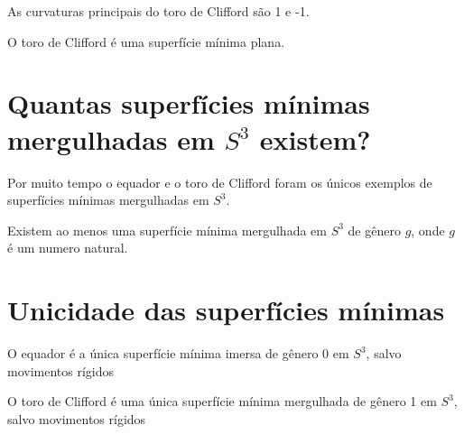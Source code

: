 \begin{proposicao}
	As curvaturas principais do toro de Clifford são 1 e -1.
\end{proposicao}

\begin{proposicao}
	O toro de Clifford é uma superfície mínima plana.
\end{proposicao}

\section{Quantas superfícies mínimas mergulhadas em $S^3$ existem?}

\begin{observacao}
	Por muito tempo o equador e o toro de Clifford foram os únicos exemplos de superfícies mínimas mergulhadas em $S^3$.
\end{observacao}

\begin{teorema}[Lawson]
	Existem ao menos uma superfície mínima mergulhada em $S^3$ de gênero $g$, onde $g$ é um numero natural.
\end{teorema}


\section{Unicidade das superfícies mínimas}

\begin{teorema}[Almgren]
	O equador é a única superfície mínima imersa de gênero 0 em $S^3$, salvo movimentos rígidos
\end{teorema}

\begin{observacao}
	O toro de Clifford é uma única superfície mínima mergulhada de gênero 1 em $S^3$, salvo movimentos rígidos
\end{observacao}